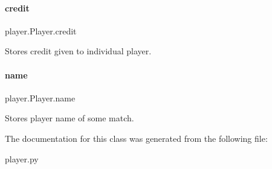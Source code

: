 \paragraph{\texorpdfstring{credit}{credit}}
{\footnotesize\ttfamily player.\+Player.\+credit}



Stores credit given to individual player. 

\mbox{\label{classplayer_1_1Player_ab2daaa8e6d26dd7174af789d9f3cab8d}} 
\paragraph{\texorpdfstring{name}{name}}
{\footnotesize\ttfamily player.\+Player.\+name}



Stores player name of some match. 



The documentation for this class was generated from the following file\+:\begin{DoxyCompactItemize}
\item 
player.\+py\end{DoxyCompactItemize}
